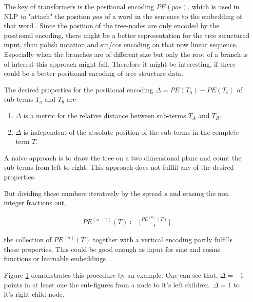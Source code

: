\documentclass{scrartcl}
\theoremstyle{definition}
\begin{document}
The key of transformers is the positional encoding $PE\left( pos\right)$, which is used in NLP to "attach" the position $pos$ of a word in the sentence to the embedding of that word \cite{vaswani2017attention}.
Since the position of the tree-nodes are only encoded by the positional encoding, there might be a better representation for the tree structured input,
than polish notation and sin/cos encoding on that now linear sequence.
Especially when the branches are of different size but only the root of a branch is of interest this approach might fail.
Therefore it might be interesting, if there could be a better positional encoding of tree structure data.

The desired properties for the positional encoding $\Delta= PE\left( T_a \right) - PE\left( T_b \right)$ of sub-terms $T_a$ and $T_b$ are
\begin{enumerate}[label=(\roman*)]
	\item $\Delta$ is a metric for the relative distance between sub-terms $T_A$ and $T_B$.
	\item $\Delta$ is independent of the absolute position of the sub-terms in the complete term $T$.
\end{enumerate}

A naive approach is to draw the tree on a two dimensional plane and count the sub-terms from left to right.
This approach does not fullfil any of the desired properties.

But dividing these numbers iteratively by the spread $s$ and erasing the non integer fractions out,

\begin{align}
	PE^{(n+1)}\left( T \right) \coloneqq \lfloor \frac{PE^{(n)} \left( T \right)}{s} \rfloor
	\label{eq:positional_encoding}
\end{align}

the collection of $PE^{(n)}\left( T \right)$ together with a vertical encoding partly fulfills these properties.
This could be good enough as input for sine and cosine functions or learnable embeddings \cite{gehring2017convolutional}.

\begin{figure}[!htbp]
	\centering
	
	\label{fig:positional_encoding}
\end{figure}

Figure \ref{fig:positional_encoding} demonstrates this procedure by an example.
One can see that, $\Delta=-1$ points in at least one the sub-figures from a node to it's left children. $\Delta=1$ to it's right child node. 
\end{document}
